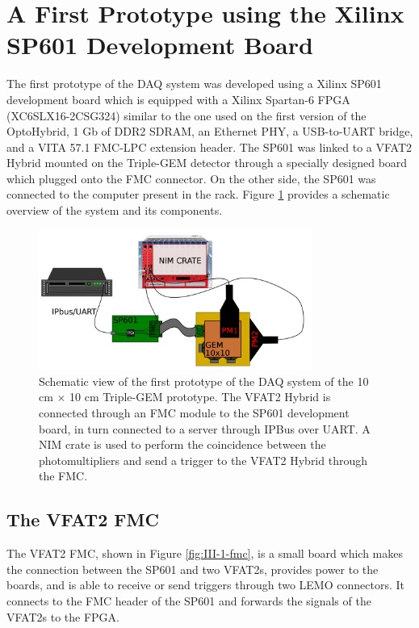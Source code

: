   \section{A First Prototype using the Xilinx SP601 Development Board}

    The first prototype of the DAQ system was developed using a Xilinx SP601 development board which is equipped with a Xilinx Spartan-6 FPGA (XC6SLX16-2CSG324) similar to the one used on the first version of the OptoHybrid, 1 Gb of DDR2 SDRAM, an Ethernet PHY, a USB-to-UART bridge, and a VITA 57.1 FMC-LPC extension header. The SP601 was linked to a VFAT2 Hybrid mounted on the Triple-GEM detector through a specially designed board which plugged onto the FMC connector. On the other side, the SP601 was connected to the computer present in the rack. Figure \ref{fig:III-1-sys-1} provides a schematic overview of the system and its components.

    \begin{figure}[h!]
      \centering
      \includegraphics[width=0.8\textwidth]{img/III-1-arch/sys_1.png}
      \caption{Schematic view of the first prototype of the DAQ system of the 10 cm $ \times $ 10 cm Triple-GEM prototype. The VFAT2 Hybrid is connected through an FMC module to the SP601 development board, in turn connected to a server through IPBus over UART. A NIM crate is used to perform the coincidence between the photomultipliers and send a trigger to the VFAT2 Hybrid through the FMC.}
      \label{fig:III-1-sys-1}
    \end{figure}

    \subsection{The VFAT2 FMC}

      The VFAT2 FMC, shown in Figure \ref{fig:III-1-fmc}, is a small board which makes the connection between the SP601 and two VFAT2s, provides power to the boards, and is able to receive or send triggers through two LEMO connectors. It connects to the FMC header of the SP601 and forwards the signals of the VFAT2s to the FPGA.


